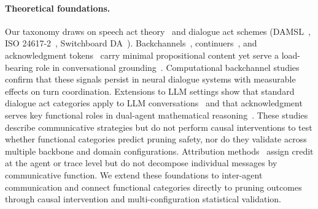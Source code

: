 \paragraph{Theoretical foundations.}
Our taxonomy draws on speech act theory~\cite{austin_how_1962, searle_speech_acts_1969} and dialogue act schemes (DAMSL~\cite{core_damsl_1997}, ISO 24617-2~\cite{bunt_iso_2012}, Switchboard DA~\cite{stolcke_dialogue_acts_2000}). Backchannels~\cite{yngve_getting_1970}, continuers~\cite{schegloff_discourse_1982}, and acknowledgment tokens~\cite{jefferson_acknowledgment_1984} carry minimal propositional content yet serve a load-bearing role in conversational grounding~\cite{clark_contributing_1989}. Computational backchannel studies~\cite{inoue_backchannel_2025, qian_backchannel_2026} confirm that these signals persist in neural dialogue systems with measurable effects on turn coordination. Extensions to LLM settings show that standard dialogue act categories apply to LLM conversations~\cite{qamar_dialogue_acts_2025} and that acknowledgment serves key functional roles in dual-agent mathematical reasoning~\cite{zhang_communication_strategies_2025}. These studies describe communicative strategies but do not perform causal interventions to test whether functional categories predict pruning safety, nor do they validate across multiple backbone and domain configurations. Attribution methods~\cite{xia_hivemind_2026, horovicz_agentshap_2025, cemri_mast_2025} assign credit at the agent or trace level but do not decompose individual messages by communicative function. We extend these foundations to inter-agent communication and connect functional categories directly to pruning outcomes through causal intervention and multi-configuration statistical validation.
